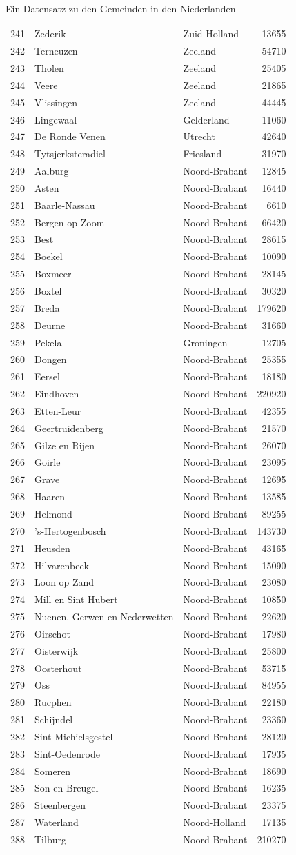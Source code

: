 \documentclass[ignorenonframetext,]{beamer}
\begin{document}
\begin{frame}[fragile]{Ein Datensatz zu den Gemeinden in den
Niederlanden}
\begin{longtable}[]{@{}lllr@{}}
241 & Zederik & Zuid-Holland & 13655\tabularnewline
242 & Terneuzen & Zeeland & 54710\tabularnewline
243 & Tholen & Zeeland & 25405\tabularnewline
244 & Veere & Zeeland & 21865\tabularnewline
245 & Vlissingen & Zeeland & 44445\tabularnewline
246 & Lingewaal & Gelderland & 11060\tabularnewline
247 & De Ronde Venen & Utrecht & 42640\tabularnewline
248 & Tytsjerksteradiel & Friesland & 31970\tabularnewline
249 & Aalburg & Noord-Brabant & 12845\tabularnewline
250 & Asten & Noord-Brabant & 16440\tabularnewline
251 & Baarle-Nassau & Noord-Brabant & 6610\tabularnewline
252 & Bergen op Zoom & Noord-Brabant & 66420\tabularnewline
253 & Best & Noord-Brabant & 28615\tabularnewline
254 & Boekel & Noord-Brabant & 10090\tabularnewline
255 & Boxmeer & Noord-Brabant & 28145\tabularnewline
256 & Boxtel & Noord-Brabant & 30320\tabularnewline
257 & Breda & Noord-Brabant & 179620\tabularnewline
258 & Deurne & Noord-Brabant & 31660\tabularnewline
259 & Pekela & Groningen & 12705\tabularnewline
260 & Dongen & Noord-Brabant & 25355\tabularnewline
261 & Eersel & Noord-Brabant & 18180\tabularnewline
262 & Eindhoven & Noord-Brabant & 220920\tabularnewline
263 & Etten-Leur & Noord-Brabant & 42355\tabularnewline
264 & Geertruidenberg & Noord-Brabant & 21570\tabularnewline
265 & Gilze en Rijen & Noord-Brabant & 26070\tabularnewline
266 & Goirle & Noord-Brabant & 23095\tabularnewline
267 & Grave & Noord-Brabant & 12695\tabularnewline
268 & Haaren & Noord-Brabant & 13585\tabularnewline
269 & Helmond & Noord-Brabant & 89255\tabularnewline
270 & 's-Hertogenbosch & Noord-Brabant & 143730\tabularnewline
271 & Heusden & Noord-Brabant & 43165\tabularnewline
272 & Hilvarenbeek & Noord-Brabant & 15090\tabularnewline
273 & Loon op Zand & Noord-Brabant & 23080\tabularnewline
274 & Mill en Sint Hubert & Noord-Brabant & 10850\tabularnewline
275 & Nuenen. Gerwen en Nederwetten & Noord-Brabant &
22620\tabularnewline
276 & Oirschot & Noord-Brabant & 17980\tabularnewline
277 & Oisterwijk & Noord-Brabant & 25800\tabularnewline
278 & Oosterhout & Noord-Brabant & 53715\tabularnewline
279 & Oss & Noord-Brabant & 84955\tabularnewline
280 & Rucphen & Noord-Brabant & 22180\tabularnewline
281 & Schijndel & Noord-Brabant & 23360\tabularnewline
282 & Sint-Michielsgestel & Noord-Brabant & 28120\tabularnewline
283 & Sint-Oedenrode & Noord-Brabant & 17935\tabularnewline
284 & Someren & Noord-Brabant & 18690\tabularnewline
285 & Son en Breugel & Noord-Brabant & 16235\tabularnewline
286 & Steenbergen & Noord-Brabant & 23375\tabularnewline
287 & Waterland & Noord-Holland & 17135\tabularnewline
288 & Tilburg & Noord-Brabant & 210270\tabularnewline

\end{longtable}
\end{frame}
\end{document}
